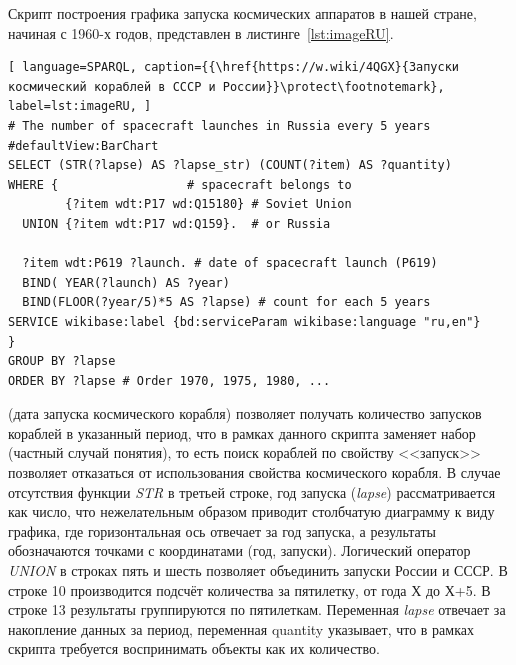 Скрипт построения графика запуска космических аппаратов в нашей стране, начиная с 1960-х годов, представлен в листинге~\ref{lst:imageRU}.
\begin{lstlisting}[ language=SPARQL, caption={{\href{https://w.wiki/4QGX}{Запуски космический кораблей в СССР и России}}\protect\footnotemark}, label=lst:imageRU, ]
# The number of spacecraft launches in Russia every 5 years
#defaultView:BarChart
SELECT (STR(?lapse) AS ?lapse_str) (COUNT(?item) AS ?quantity)
WHERE {                  # spacecraft belongs to
        {?item wdt:P17 wd:Q15180} # Soviet Union
  UNION {?item wdt:P17 wd:Q159}.  # or Russia
  
  ?item wdt:P619 ?launch. # date of spacecraft launch (P619)
  BIND( YEAR(?launch) AS ?year) 
  BIND(FLOOR(?year/5)*5 AS ?lapse) # count for each 5 years
SERVICE wikibase:label {bd:serviceParam wikibase:language "ru,en"}
} 
GROUP BY ?lapse
ORDER BY ?lapse # Order 1970, 1975, 1980, ...
\end{lstlisting}
 (дата запуска космического корабля) позволяет получать количество запусков кораблей в указанный период, что в рамках данного скрипта заменяет набор  (частный случай понятия), то есть поиск кораблей по свойству <<запуск>> позволяет отказаться от использования свойства  космического корабля. В случае отсутствия функции {\it STR} в третьей строке, год запуска ({\it lapse}) рассматривается как число, что нежелательным образом приводит столбчатую диаграмму к виду графика, где горизонтальная ось отвечает за год запуска, а результаты обозначаются точками с координатами (год, запуски). Логический оператор {\it UNION} в строках пять и шесть позволяет объединить запуски России и СССР. В строке 10 производится подсчёт количества за пятилетку, от года Х до Х+5. В строке 13 результаты группируются по пятилеткам. Переменная {\it lapse} отвечает за накопление данных за период, переменная quantity указывает, что в рамках скрипта требуется воспринимать объекты как их количество.


